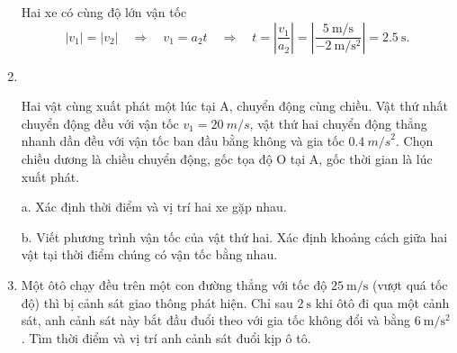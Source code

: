 \begin{enumerate}[label=\bfseries Bài \arabic*:]
{\begin{enumerate}[label=\alph*.]
		Hai xe có cùng độ lớn vận tốc
		$$\left|v_1\right|=\left|v_2\right|\quad\Rightarrow\quad v_1=a_2t\quad\Rightarrow\quad t=\left|\dfrac{v_1}{a_2}\right|=\left|\dfrac{\SI{5}{\meter/\second}}{\SI{-2}{\meter/\second^{2}}}\right|=\SI{2.5}{\second}.$$
	\end{enumerate}
}

\item {}\\
{Hai vật cùng xuất phát một lúc tại A, chuyển động cùng chiều. Vật thứ nhất chuyển động đều với vận tốc $v_1 = \SI{20}{m/s}$, vật thứ hai chuyển động thẳng nhanh dần đều với vận tốc ban đầu bằng không và gia tốc $\SI{0,4}{m/s}^2$. Chọn chiều dương là chiều chuyển động, gốc tọa độ O tại A, gốc thời gian là lúc xuất phát.
	
	a.  Xác định thời điểm và vị trí hai xe gặp nhau.
	
	b.  Viết phương trình vận tốc của vật thứ hai. Xác định khoảng cách giữa hai vật tại thời điểm chúng có vận tốc bằng nhau.
	
}

\item {}


{
	Một ôtô chạy đều trên một con đường thẳng với tốc độ $\SI{25}{\meter/\second}$ (vượt quá tốc độ) thì bị cảnh sát giao thông phát hiện. Chỉ sau $\SI{2}{\second}$ khi ôtô đi qua một cảnh sát, anh cảnh sát này bắt đầu đuổi theo với gia tốc không đổi và bằng $\SI{6}{\meter/\second^2}$. Tìm thời điểm và vị trí anh cảnh sát đuổi kịp ô tô.
}


\end{enumerate}
